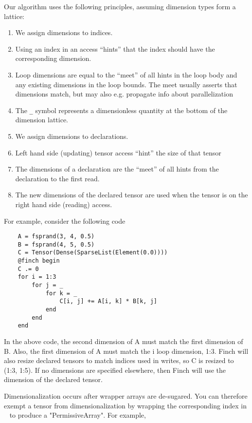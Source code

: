     Our algorithm uses the following principles, assuming dimension types form a
    lattice:
    \begin{enumerate}
        \item We assign dimensions to indices.
        \item Using an index in an access “hints” that the index should have the corresponding dimension.
        \item Loop dimensions are equal to the “meet” of all hints in the loop body
        and any existing dimensions in the loop bounds. The meet usually asserts
        that dimensions match, but may also e.g. propagate info about parallelization
        \item The \texttt{_} symbol represents a dimensionless quantity at the bottom of the dimension lattice.
        \item We assign dimensions to declarations.
        \item Left hand side (updating) tensor access “hint” the size of that tensor
        \item The dimensions of a declaration are the “meet” of all hints from
        the declaration to the first read.
        \item The new dimensions of the declared tensor are used when the tensor is on the right hand side (reading)
        access.
    \end{enumerate}

    For example, consider the following code
    
    \begin{verbatim}
    A = fsprand(3, 4, 0.5)
    B = fsprand(4, 5, 0.5)
    C = Tensor(Dense(SparseList(Element(0.0))))
    @finch begin
    C .= 0
    for i = 1:3
        for j = _
            for k = _
                C[i, j] += A[i, k] * B[k, j]
            end
        end
    end
    \end{verbatim}
    
    In the above code, the second dimension of A must match the first dimension of B. Also, the first dimension of A must match the i loop dimension, 1:3. Finch will also resize declared tensors to match indices used in writes, so C is resized to (1:3, 1:5). If no dimensions are specified elsewhere, then Finch will use the dimension of the declared tensor.
    
    Dimensionalization occurs after wrapper arrays are de-sugared. You can
    therefore exempt a tensor from dimensionalization by wrapping the
    corresponding index in ~ to produce a "PermissiveArray". For example,
    
